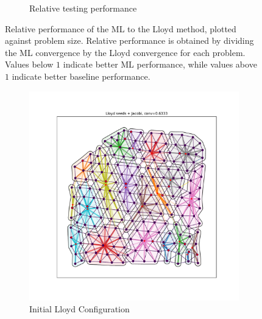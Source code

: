 \documentclass{article}
\begin{document}
\begin{figure}[h]
\begin{subfigure}[t]{0.49\textwidth}
    \caption{Relative testing performance}
  \end{subfigure}
  \caption{Relative performance of the ML to the Lloyd method, plotted against problem size.  Relative performance is obtained by dividing the ML convergence by the Lloyd convergence for each problem.  Values below $1$ indicate better ML performance, while values above $1$ indicate better baseline performance.}
  \label{fig:aniso_rel_conv}
\end{figure}

\begin{figure}[h]
  \centering
  \begin{subfigure}[t]{0.32\textwidth}
    \centering
    \includegraphics[width=\textwidth, trim=80 70 70 50, clip]{grid_anis_3_dumb.pdf}
    \caption{Initial Lloyd Configuration}
  \end{subfigure}
  \begin{subfigure}[t]{0.32\textwidth}
    \centering

\end{subfigure}
\end{figure}
\end{document}
